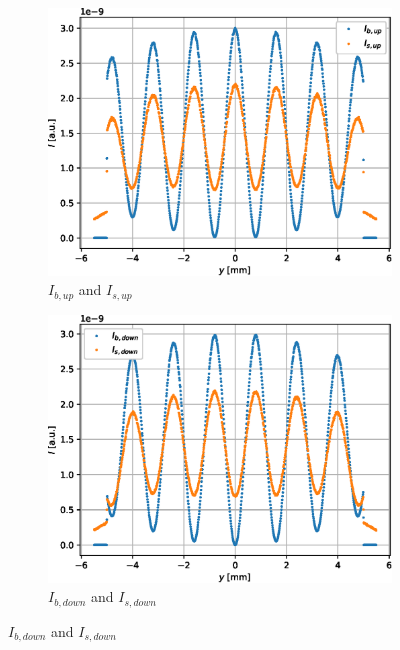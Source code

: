 \begin{figure}[htbp]
	\centering
	\begin{subfigure}[b]{0.45\textwidth}
		\centering
		\includegraphics[width=\textwidth]{simulation-raw-intensity-up}
		\caption{$I_{b,up}$ and $I_{s,up}$}
		\label{fig:simulation-raw-intensity-up}
	\end{subfigure}
	\hfill
	\begin{subfigure}[b]{0.45\textwidth}
		\centering
		\includegraphics[width=\textwidth]{simulation-raw-intensity-down}
		\caption{$I_{b,down}$ and $I_{s,down}$}
		\label{fig:simulation-raw-intensity-down}
	\end{subfigure}

\end{figure}
